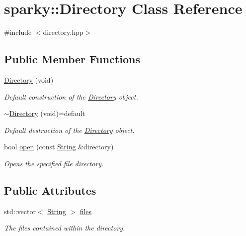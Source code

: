 \hypertarget{structsparky_1_1_directory}{}\section{sparky\+:\+:Directory Class Reference}
\label{structsparky_1_1_directory}


{\ttfamily \#include $<$directory.\+hpp$>$}

\subsection*{Public Member Functions}
\begin{DoxyCompactItemize}
\item 
\hyperlink{structsparky_1_1_directory_a5c4c1ff8adf3ca529b6f976f31a59fc2}{Directory} (void)
\begin{DoxyCompactList}\small\item\em Default construction of the \hyperlink{structsparky_1_1_directory}{Directory} object. \end{DoxyCompactList}\item 
\hyperlink{structsparky_1_1_directory_aef9bb242703e80c76e133436b591b374}{$\sim$\+Directory} (void)=default\hypertarget{structsparky_1_1_directory_aef9bb242703e80c76e133436b591b374}{}\label{structsparky_1_1_directory_aef9bb242703e80c76e133436b591b374}

\begin{DoxyCompactList}\small\item\em Default destruction of the \hyperlink{structsparky_1_1_directory}{Directory} object. \end{DoxyCompactList}\item 
bool \hyperlink{structsparky_1_1_directory_a04f6c9bdd1b26f4f6bdee481f9f3f14a}{open} (const \hyperlink{classsparky_1_1_string}{String} \&directory)
\begin{DoxyCompactList}\small\item\em Opens the specified file directory. \end{DoxyCompactList}\end{DoxyCompactItemize}
\subsection*{Public Attributes}
\begin{DoxyCompactItemize}
\item 
std\+::vector$<$ \hyperlink{classsparky_1_1_string}{String} $>$ \hyperlink{structsparky_1_1_directory_a31d9ef58b6735c4f25de319a183a5849}{files}\hypertarget{structsparky_1_1_directory_a31d9ef58b6735c4f25de319a183a5849}{}\label{structsparky_1_1_directory_a31d9ef58b6735c4f25de319a183a5849}

\begin{DoxyCompactList}\small\item\em The files contained within the directory. \end{DoxyCompactList}\end{DoxyCompactItemize}


